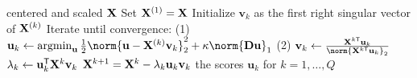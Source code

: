 \documentclass{article}
\newcommand{\pcatf}{FusedPCA\xspace}
\newcommand{\X}{\bfX}
\DeclareMathOperator{\argmin}{argmin}
\renewcommand{\top}{\mathsf{T}}
\begin{document}
\begin{algorithm}
  \begin{algorithmic}[1]  centered and scaled $\X$
    \STATE Set $\X^{(1)} = \X$
        \STATE Initialize $\mathbf{v}_k$ as the first right singular vector of $\X^{(k)}$ 
        \STATE Iterate until convergence: 
        \STATE \quad\quad (1) $\mathbf{u}_k \leftarrow \argmin_{\mathbf{u}}  \frac{1}{2} \norm{\mathbf{u} - \X^{(k)} \mathbf{v}_k }^2_2 + \kappa \norm{\mathbf{D} \mathbf{u}}_1 $ 
        \STATE \quad\quad (2) $\mathbf{v}_k \leftarrow \frac{\X^{k\top} \mathbf{u}_k}{ \norm{
        \X^{k\top} \mathbf{u}_k}_2}$ 
        \STATE $\lambda_k \leftarrow \mathbf{u}^\top_k \X^k \mathbf{v}_k$ 
        \STATE $\X^{k+1} = \X^k - \lambda_k \mathbf{u}_k \mathbf{v}_k$
    \ENDFOR
     the scores $\mathbf{u}_k$ for $k = 1,
\ldots, Q$
    \end{algorithmic}
  \caption{\pcatf}
  \label{alg:PCAleverage_trend}
\end{algorithm}






\end{document}
